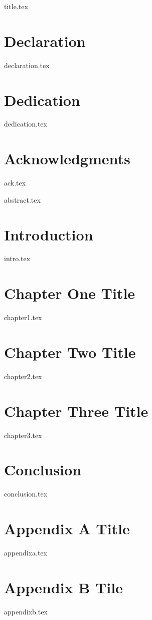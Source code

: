 \documentclass[12pt, oneside]{book}
\begin{document}
{title.tex}

\onehalfspacing
\frontmatter
\chapter*{Declaration}
{declaration.tex}

\chapter*{Dedication}
{dedication.tex}

\chapter*{Acknowledgments}
{ack.tex}

\singlespacing
\renewcommand*\contentsname{Table of Contents}

\tableofcontents

\listoffigures

\listoftables

\printglossary[type=\acronymtype,title=List of Abbreviation, toctitle=List of Abbreviation,nonumberlist]

\newpage
{abstract.tex}

\newpage

\doublespacing
\mainmatter

\chapter{Introduction}
{intro.tex}
\chapter{Chapter One Title}
{chapter1.tex}
\chapter{Chapter Two Title}
{chapter2.tex}
\chapter{Chapter Three Title}
{chapter3.tex}
\chapter{Conclusion}
{conclusion.tex}

\appendix
\chapter{Appendix A Title}
{appendixa.tex}

\chapter{Appendix B Tile}
{appendixb.tex}

\clearpage
\printbibliography

\clearpage
\end{document}
